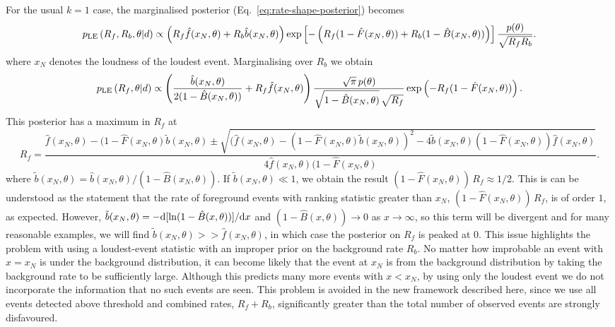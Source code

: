 \documentclass[aps,prd]{revtex4-1}
\begin{document}
For the usual $k=1$ case, the marginalised posterior (Eq.~\eqref{eq:rate-shape-posterior}) becomes
\begin{equation}
p_{\rm LE}\left( R_f, R_b, \theta | d \right) \propto \left(R_f \hat{f}(x_N,\theta) + R_b \hat{b}(x_N,\theta)\right)\exp\left[-\left( R_f (1-\hat{F}(x_N,\theta)) +
      R_b (1-\hat{B}(x_N,\theta)) \right) \right] \frac{p(\theta)}{\sqrt{R_f R_b}}.
\end{equation}
where $x_N$ denotes the loudness of the loudest event. Marginalising over $R_b$ we obtain
\begin{equation}
p_{\rm LE}\left( R_f, \theta | d \right) \propto \left( \frac{\hat{b}(x_N,\theta)}{2(1-\hat{B}(x_N,\theta))} + R_f \hat{f}(x_N,\theta)\right)\frac{\sqrt{\pi}\, p(\theta)}{\sqrt{1-\hat{B}(x_N,\theta)}\,\sqrt{R_f}} \exp\left(-R_f(1-\hat{F}(x_N,\theta))\right) .
\end{equation}
This posterior has a maximum in $R_f$ at
\begin{equation}
R_f = \frac{\hat{f}(x_N,\theta)-(1-\hat{F}(x_N,\theta)\tilde{b}(x_N,\theta) \pm \sqrt{(\hat{f}(x_N,\theta)-(1-\hat{F}(x_N,\theta)\tilde{b}(x_N,\theta))^2 - 4\tilde{b}(x_N,\theta)(1-\hat{F}(x_N,\theta))\hat{f}(x_N,\theta)}}{4 \hat{f}(x_N,\theta)(1-\hat{F}(x_N,\theta)}.
\end{equation}
where $\tilde{b}(x_N,\theta) =\hat{b}(x_N,\theta)/(1-\hat{B}(x_N,\theta))$. If $\tilde{b}(x_N,\theta) \ll 1$, we obtain the result $(1- \hat{F}(x_N,\theta))\,R_f \approx 1/2$. This is can be understood as the statement that the rate of foreground events with ranking statistic greater than $x_N$,  $(1- \hat{F}(x_N,\theta))\,R_f$, is of order $1$, as expected. However, $\tilde{b}(x_N,\theta) = -{\rm d} [\ln(1-\hat{B}(x,\theta))]/{\rm d}x$ and $(1-\hat{B}(x,\theta)) \rightarrow 0$ as $x \rightarrow \infty$, so this term will be divergent and for many reasonable examples, we will find $\tilde{b}(x_N,\theta) >> \hat{f}(x_N,\theta)$, in which case the posterior on $R_f$ is peaked at $0$. This issue highlights the problem with using a loudest-event statistic with an improper prior on the background rate $R_b$. No matter how improbable an event with $x=x_N$ is under the background distribution, it can become likely that the event at $x_N$ is from the background distribution by taking the background rate to be sufficiently large. Although this predicts many more events with $x < x_N$, by using only the loudest event we do not incorporate the information that no such events are seen. This problem is avoided in the new framework described here, since we use all events detected above threshold and combined rates, $R_f+R_b$, significantly greater than the total number of observed events are strongly disfavoured.
\end{document}
